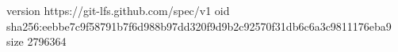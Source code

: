version https://git-lfs.github.com/spec/v1
oid sha256:eebbe7c9f58791b7f6d988b97dd320f9d9b2c92570f31db6c6a3c9811176eba9
size 2796364
